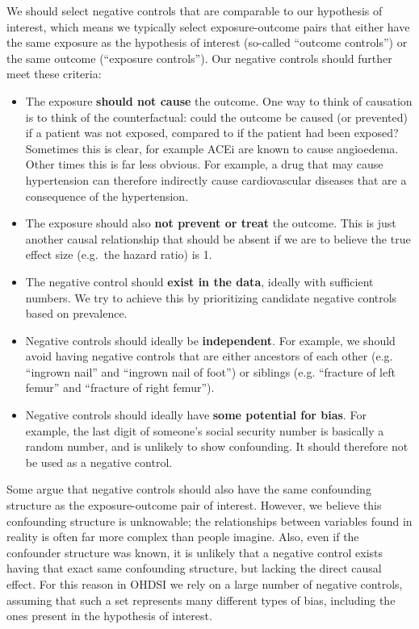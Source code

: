 \documentclass[11pt]{book}
\providecommand{\tightlist}{%
  \setlength{\itemsep}{0pt}\setlength{\parskip}{0pt}}
\theoremstyle{definition}
\theoremstyle{definition}
\theoremstyle{definition}
\theoremstyle{remark}
\begin{document}
We should select negative controls that are comparable to our hypothesis
of interest, which means we typically select exposure-outcome pairs that
either have the same exposure as the hypothesis of interest (so-called
``outcome controls'') or the same outcome (``exposure controls''). Our
negative controls should further meet these criteria:

\begin{itemize}
\tightlist
\item
  The exposure \textbf{should not cause} the outcome. One way to think
  of causation is to think of the counterfactual: could the outcome be
  caused (or prevented) if a patient was not exposed, compared to if the
  patient had been exposed? Sometimes this is clear, for example ACEi
  are known to cause angioedema. Other times this is far less obvious.
  For example, a drug that may cause hypertension can therefore
  indirectly cause cardiovascular diseases that are a consequence of the
  hypertension.
\item
  The exposure should also \textbf{not prevent or treat} the outcome.
  This is just another causal relationship that should be absent if we
  are to believe the true effect size (e.g.~the hazard ratio) is 1.
\item
  The negative control should \textbf{exist in the data}, ideally with
  sufficient numbers. We try to achieve this by prioritizing candidate
  negative controls based on prevalence.
\item
  Negative controls should ideally be \textbf{independent}. For example,
  we should avoid having negative controls that are either ancestors of
  each other (e.g. ``ingrown nail'' and ``ingrown nail of foot'') or
  siblings (e.g. ``fracture of left femur'' and ``fracture of right
  femur'').
\item
  Negative controls should ideally have \textbf{some potential for
  bias}. For example, the last digit of someone's social security number
  is basically a random number, and is unlikely to show confounding. It
  should therefore not be used as a negative control.
\end{itemize}

Some argue that negative controls should also have the same confounding
structure as the exposure-outcome pair of interest.
\citep{lipsitch_2010} However, we believe this confounding structure is
unknowable; the relationships between variables found in reality is
often far more complex than people imagine. Also, even if the confounder
structure was known, it is unlikely that a negative control exists
having that exact same confounding structure, but lacking the direct
causal effect. For this reason in OHDSI we rely on a large number of
negative controls, assuming that such a set represents many different
types of bias, including the ones present in the hypothesis of interest.
\end{document}
